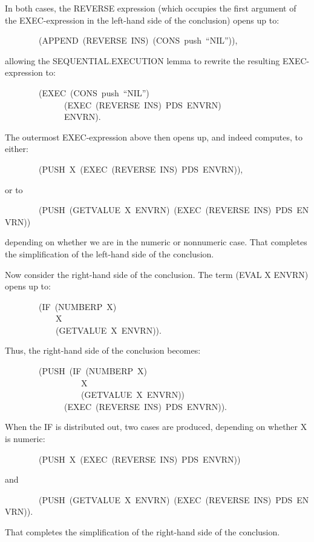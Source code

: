 \documentclass[10pt]{book}
\newenvironment{pubasis}{\begin{flushleft}}{\end{flushleft}}
\begin{document}
In both cases, the REVERSE expression (which occupies the first argument of the EXEC-expression
in the left-hand side of the conclusion) opens up
to:
\begin{pubasis}
~~~~~~~~(APPEND~(REVERSE~INS)~(CONS~push~``NIL'')),\\
\end{pubasis}
allowing the
SEQUENTIAL.EXECUTION lemma to rewrite the resulting EXEC-expression to:
\begin{pubasis}
~~~~~~~~(EXEC~(CONS~push~``NIL'')\\
~~~~~~~~~~~~~~(EXEC~(REVERSE~INS)~PDS~ENVRN)\\
~~~~~~~~~~~~~~ENVRN).\\
\end{pubasis}
The outermost EXEC-expression above then opens up, and indeed computes, to
either:
\begin{pubasis}
~~~~~~~~(PUSH~X~(EXEC~(REVERSE~INS)~PDS~ENVRN)),\\
\end{pubasis}
or to
\begin{pubasis}
~~~~~~~~(PUSH~(GETVALUE~X~ENVRN)~(EXEC~(REVERSE~INS)~PDS~ENVRN))\\
\end{pubasis}
depending on whether we are in the numeric or nonnumeric case.
That completes the simplification of the left-hand side of the conclusion.

Now consider the right-hand side of the conclusion.  The term
(EVAL X ENVRN) opens up to:
\begin{pubasis}
~~~~~~~~(IF~(NUMBERP~X)\\
~~~~~~~~~~~~X\\
~~~~~~~~~~~~(GETVALUE~X~ENVRN)).\\
\end{pubasis}
Thus, the right-hand side of the conclusion becomes:
\begin{pubasis}
~~~~~~~~(PUSH~(IF~(NUMBERP~X)\\
~~~~~~~~~~~~~~~~~~X\\
~~~~~~~~~~~~~~~~~~(GETVALUE~X~ENVRN))\\
~~~~~~~~~~~~~~(EXEC~(REVERSE~INS)~PDS~ENVRN)).\\
\end{pubasis}
When the IF is distributed out, two cases are produced, depending
on whether X is numeric:
\begin{pubasis}
~~~~~~~~(PUSH~X~(EXEC~(REVERSE~INS)~PDS~ENVRN))\\
\end{pubasis}
and
\begin{pubasis}
~~~~~~~~(PUSH~(GETVALUE~X~ENVRN)~(EXEC~(REVERSE~INS)~PDS~ENVRN)).\\
\end{pubasis}
That completes the simplification of the right-hand side of
the conclusion.
\end{document}
